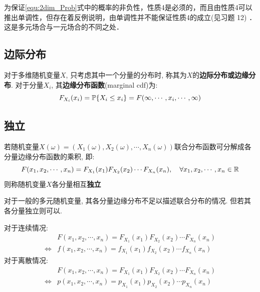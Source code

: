 为保证\ref{equ:2dim_Prob}式中的概率的非负性，性质4是必须的，而且由性质4可以推出单调性，但存在着反例说明，由单调性并不能保证性质4的成立(见习题 12) ．这是多元场合与一元场合的不同之处．

\subsection{边际分布}

\begin{definition}
    对于多维随机变量$X$, 只考虑其中一个分量的分布时, 称其为$X$的\textbf{边际分布或边缘分布}. 对于分量$X_i$, 其\textbf{边缘分布函数}(marginal cdf)为:
    \[ F_{X_i}(x_i) = \P\{ X_i \le x_i \} = F(\infty,\cdots , x_i ,\cdots ,\infty)\] 
\end{definition}



\subsection{独立}

\begin{definition}[独立随机变量]
    若随机变量$X(\omega) = (X_1(\omega), X_2(\omega),\cdots , X_n(\omega))$联合分布函数可分解成各分量边缘分布函数的乘积, 即:
    \[ F(x_1,x_2,\cdots ,x_n) = F_{X_1}(x_1)F_{X_2}(x_2)\cdots F_{X_n}(x_n) , \quad \forall x_1,x_2,\cdots ,x_n \in \R \] 
    则称随机变量$X$各分量相互\textbf{独立}
\end{definition}

\begin{remark}
    对于一般的多元随机变量, 其各分量边缘分布不足以描述联合分布的情况. 但若其各分量独立则可以.
\end{remark}

\begin{theorem}
    对于连续情况:
    \begin{align*}
        &F(x_1,x_2,\cdots ,x_n) = F_{X_1}(x_1)F_{X_2}(x_2)\cdots F_{X_n}(x_n) \\
        \Leftrightarrow & f(x_1,x_2,\cdots ,x_n) = f_{X_1}(x_1)f_{X_2}(x_2)\cdots f_{X_n}(x_n)
    \end{align*}
    对于离散情况:
    \begin{align*}
        &F(x_1,x_2,\cdots ,x_n) = F_{X_1}(x_1)F_{X_2}(x_2)\cdots F_{X_n}(x_n) \\
        \Leftrightarrow & p(x_1,x_2,\cdots ,x_n) = p_{X_1}(x_1)p_{X_2}(x_2)\cdots p_{X_n}(x_n)
    \end{align*}
\end{theorem}

